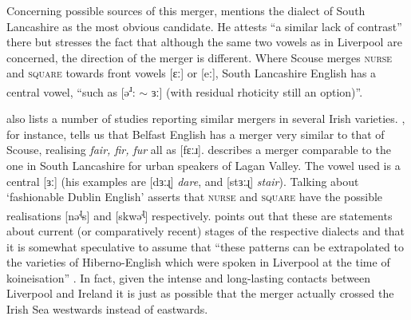 Concerning possible sources of this merger, \citet[128]{honeybone2007} mentions the dialect of South Lancashire as the most obvious candidate.
He attests ``a similar lack of contrast'' there but stresses the fact that although the same two vowels as in Liverpool are concerned, the direction of the merger is different.
Where Scouse merges \textsc{nurse} and \textsc{square} towards front vowels [ɛː] or [eː], South Lancashire English has a central vowel, ``such as [ə\textsuperscript{ɹ}: \(\sim\) ɜː] (with residual rhoticity still an option)''.

\citeauthor{honeybone2007} also lists a number of studies reporting similar mergers in several Irish varieties.
\citet{wells1982}, for instance, tells us that Belfast English has a merger very similar to that of Scouse, realising \emph{fair, fir, fur} all as [fɛːɹ].
\citet[cf.][48]{harris1985} describes a merger comparable to the one in South Lancashire for urban speakers of Lagan Valley.
The vowel used is a central [ɜː] (his examples are [dɜːɻ] \emph{dare}, and [stɜːɻ] \emph{stair}).
Talking about `fashionable Dublin English' \citet{hickey1999} asserts that \textsc{nurse} and \textsc{square} have the possible realisations [nə\textsuperscript{ɻ}s] and [skwə\textsuperscript{ɻ}] respectively.
\citeauthor{honeybone2007} points out that these are statements about current (or comparatively recent) stages of the respective dialects and that it is somewhat speculative to assume that ``these patterns can be extrapolated to the varieties of Hiberno-English which were spoken in Liverpool at the time of koineisation'' \citeyearpar[128]{honeybone2007}.
In fact, given the intense and long-lasting contacts between Liverpool and Ireland it is just as possible that the merger actually crossed the Irish Sea westwards instead of eastwards.

